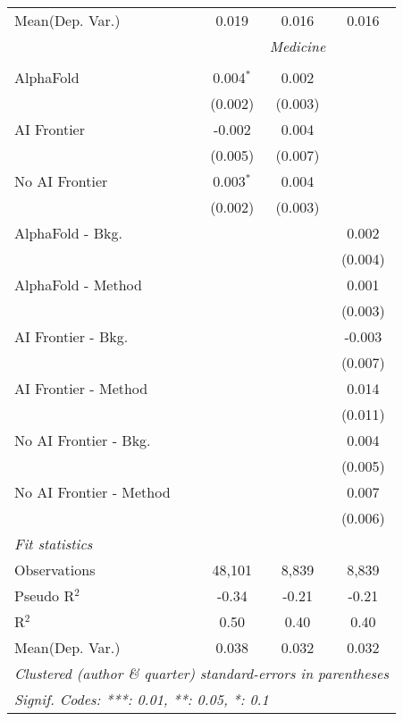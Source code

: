 \begin{tabular}{lccc}
Mean(Dep. Var.) & 0.019 & 0.016 & 0.016 \\
 & \multicolumn{3}{c}{\textit{Medicine}} \\ \\
   AlphaFold               & 0.004$^{*}$ & 0.002   &   \\   
                           & (0.002)     & (0.003) &   \\   
   AI Frontier             & -0.002      & 0.004   &   \\   
                           & (0.005)     & (0.007) &   \\   
   No AI Frontier          & 0.003$^{*}$ & 0.004   &   \\   
                           & (0.002)     & (0.003) &   \\   
   AlphaFold - Bkg.        &             &         & 0.002\\   
                           &             &         & (0.004)\\   
   AlphaFold - Method      &             &         & 0.001\\   
                           &             &         & (0.003)\\   
   AI Frontier - Bkg.      &             &         & -0.003\\   
                           &             &         & (0.007)\\   
   AI Frontier - Method    &             &         & 0.014\\   
                           &             &         & (0.011)\\   
   No AI Frontier - Bkg.   &             &         & 0.004\\   
                           &             &         & (0.005)\\   
   No AI Frontier - Method &             &         & 0.007\\   
                           &             &         & (0.006)\\   
   \midrule
   \emph{Fit statistics}\\
   Observations            & 48,101      & 8,839   & 8,839\\  
   Pseudo R$^2$            & -0.34       & -0.21   & -0.21\\  
   R$^2$                   & 0.50        & 0.40    & 0.40\\  
Mean(Dep. Var.) & 0.038 & 0.032 & 0.032 \\
   \midrule \midrule
   \multicolumn{4}{l}{\emph{Clustered (author \& quarter) standard-errors in parentheses}}\\
   \multicolumn{4}{l}{\emph{Signif. Codes: ***: 0.01, **: 0.05, *: 0.1}}\\
\end{tabular}
\par\endgroup
